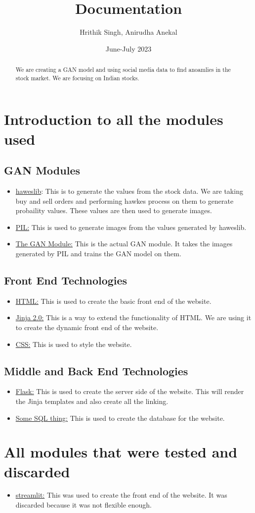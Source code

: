 \documentclass{article}
\begin{document}
\title{Documentation}
\author{Hrithik Singh, Anirudha Anekal}
\date{June-July 2023}
\maketitle
\begin{abstract}
We are creating a GAN model and using social media data to find anoamlies in the stock market. We are focusing on Indian stocks.
\end{abstract}
\section{Introduction to all the modules used}
\subsection{GAN Modules}
\begin{itemize}
\item \underline{haweslib}: This is to generate the values from the stock data. We are taking buy and sell orders and performing hawkes process on them to generate probaility values. These values are then used to generate images.
\item \underline{PIL:} This is used to generate images from the values generated by haweslib.
\item \underline{The GAN Module:} This is the actual GAN module. It takes the images generated by PIL and trains the GAN model on them.
\end{itemize}
\subsection{Front End Technologies}
\begin{itemize}
\item \underline{HTML:} This is used to create the basic front end of the website.
\item \underline{Jinja 2.0:} This is a way to extend the functionality of HTML. We are using it to create the dynamic front end of the website.
\item \underline{CSS:} This is used to style the website.
\end{itemize}
\subsection{Middle and Back End Technologies}
\begin{itemize}
\item \underline{Flask:} This is used to create the server side of the website. This will render the Jinja templates and also create all the linking.
\item \underline{Some SQL thing:} This is used to create the database for the website.
\end{itemize}
\section{All modules that were tested and discarded}
\begin{itemize}
\item \underline{streamlit:} This was used to create the front end of the website. It was discarded because it was not flexible enough.
\end{itemize}
\end{document}
